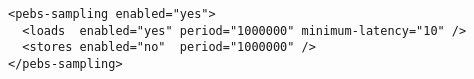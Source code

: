 \begin{verbatim}
<pebs-sampling enabled="yes">
  <loads  enabled="yes" period="1000000" minimum-latency="10" />
  <stores enabled="no"  period="1000000" />
</pebs-sampling>
\end{verbatim}
